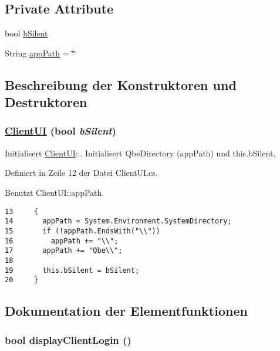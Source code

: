 \subsection*{Private Attribute}
\begin{CompactItemize}
\item 
bool \hyperlink{classQbeSAS_1_1ClientUI_QbeSAS_1_1ClientUIr0}{b\-Silent}
\item 
String \hyperlink{classQbeSAS_1_1ClientUI_QbeSAS_1_1ClientUIr1}{app\-Path} = \char`\"{}\char`\"{}
\end{CompactItemize}


\subsection{Beschreibung der Konstruktoren und Destruktoren}
\hypertarget{classQbeSAS_1_1ClientUI_QbeSAS_1_1ClientUIa0}{
\subsubsection[ClientUI]{\setlength{\rightskip}{0pt plus 5cm}\hyperlink{classQbeSAS_1_1ClientUI}{Client\-UI} (bool {\em b\-Silent})}}
\label{classQbeSAS_1_1ClientUI_QbeSAS_1_1ClientUIa0}


Initialisert \hyperlink{classQbeSAS_1_1ClientUI}{Client\-UI}::. Initialisert Qbe\-Directory (app\-Path) und this.b\-Silent. 



Definiert in Zeile 12 der Datei Client\-UI.cs.

Benutzt Client\-UI::app\-Path.



\footnotesize\begin{verbatim}13     {
14       appPath = System.Environment.SystemDirectory;
15       if (!appPath.EndsWith("\\"))
16         appPath += "\\";
17       appPath += "Qbe\\";
18 
19       this.bSilent = bSilent;
20     }
\end{verbatim}\normalsize 


\subsection{Dokumentation der Elementfunktionen}
\hypertarget{classQbeSAS_1_1ClientUI_QbeSAS_1_1ClientUIa2}{
\subsubsection[displayClientLogin]{\setlength{\rightskip}{0pt plus 5cm}bool display\-Client\-Login ()}}
\label{classQbeSAS_1_1ClientUI_QbeSAS_1_1ClientUIa2}


